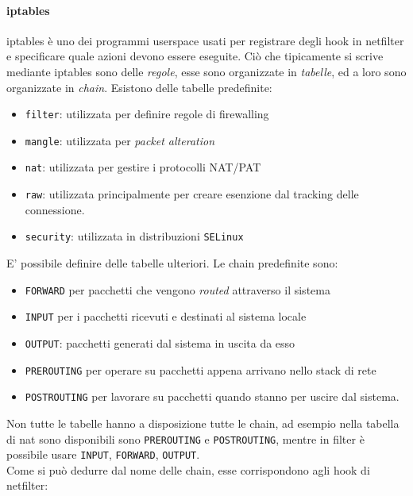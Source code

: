 \paragraph{iptables}
iptables è uno dei programmi userspace usati per registrare degli hook in netfilter e
specificare quale azioni devono essere eseguite.  Ciò che tipicamente si scrive
mediante iptables sono delle \textit{regole}, esse sono organizzate in
\textit{tabelle}, ed a loro sono organizzate in \textit{chain}. Esistono delle
tabelle predefinite:
\begin{itemize}
  \item \texttt{filter}: utilizzata per definire regole di firewalling
  \item \texttt{mangle}: utilizzata per \textit{packet alteration}
  \item \texttt{nat}: utilizzata per gestire i protocolli NAT/PAT
  \item \texttt{raw}: utilizzata principalmente per creare esenzione dal tracking
  delle connessione.
  \item \texttt{security}: utilizzata in distribuzioni \texttt{SELinux}
\end{itemize}
E' possibile definire delle tabelle ulteriori.
Le chain predefinite sono:
\begin{itemize}
  \item \texttt{FORWARD} per pacchetti che vengono \textit{routed} attraverso
  il sistema
  \item \texttt{INPUT} per i pacchetti ricevuti e destinati al sistema locale
  \item \texttt{OUTPUT}: pacchetti generati dal sistema in uscita da esso
  \item \texttt{PREROUTING} per operare su pacchetti appena arrivano nello
  stack di rete
  \item \texttt{POSTROUTING} per lavorare su pacchetti quando stanno per uscire
  dal sistema.
\end{itemize}
Non tutte le tabelle hanno a disposizione tutte le chain, ad esempio nella tabella
di nat sono disponibili sono \texttt{PREROUTING} e \texttt{POSTROUTING}, mentre
in filter è possibile usare \texttt{INPUT}, \texttt{FORWARD}, \texttt{OUTPUT}.\\
Come si può dedurre dal nome delle chain, esse corrispondono agli hook di
netfilter:

